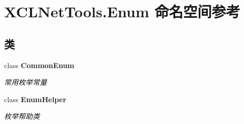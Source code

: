\hypertarget{namespace_x_c_l_net_tools_1_1_enum}{}\section{X\+C\+L\+Net\+Tools.\+Enum 命名空间参考}
\label{namespace_x_c_l_net_tools_1_1_enum}
\subsection*{类}
\begin{DoxyCompactItemize}
\item 
class {\bfseries Common\+Enum}
\begin{DoxyCompactList}\small\item\em 常用枚举常量 \end{DoxyCompactList}\item 
class {\bfseries Enum\+Helper}
\begin{DoxyCompactList}\small\item\em 枚举帮助类 \end{DoxyCompactList}\end{DoxyCompactItemize}
